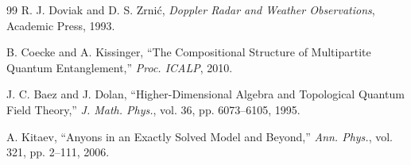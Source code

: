 \documentclass[twocolumn,10pt,a4paper]{article}
\theoremstyle{definition}
\theoremstyle{remark}
\begin{document}
\begin{thebibliography}{99}
R. J. Doviak and D. S. Zrnić,
\textit{Doppler Radar and Weather Observations},
Academic Press, 1993.

B. Coecke and A. Kissinger,
``The Compositional Structure of Multipartite Quantum Entanglement,''
\textit{Proc. ICALP}, 2010.

J. C. Baez and J. Dolan,
``Higher-Dimensional Algebra and Topological Quantum Field Theory,''
\textit{J. Math. Phys.}, vol. 36, pp. 6073--6105, 1995.

A. Kitaev,
``Anyons in an Exactly Solved Model and Beyond,''
\textit{Ann. Phys.}, vol. 321, pp. 2--111, 2006.

\end{thebibliography}
\end{document}
